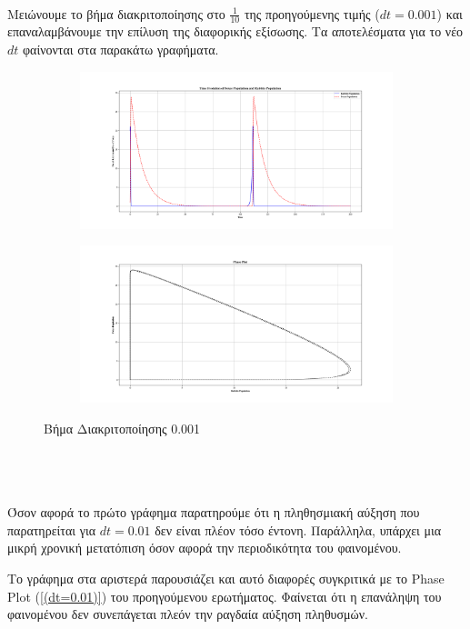 \documentclass{article}
\begin{document}
\noindent
\\
Μειώνουμε το βήμα διακριτοποίησης στο $\frac{1}{10}$ της προηγούμενης τιμής ($ dt = 0.001 $) και επαναλαμβάνουμε την επίλυση της διαφορικής εξίσωσης. Τα αποτελέσματα για το νέο $ dt $ φαίνονται στα παρακάτω γραφήματα.
\newline
\newline
\begin{figure}[H]
    \centering
	\begin{adjustbox}{center}
		\begin{subfigure}[c]{.8\textwidth}    
			\includegraphics[width=1\textwidth,height=\textheight,keepaspectratio]{media/2/dt=0.001/Figure_1.png}
		\end{subfigure}%

	    \begin{subfigure}[c]{.8\textwidth}    
			\includegraphics[width=1\textwidth,height=\textheight,keepaspectratio]{media/2/dt=0.001/Figure_2.png}
		\end{subfigure}%
	\end{adjustbox}
\caption{Βήμα Διακριτοποίησης 0.001}
\label{(dt=0.001)}
\end{figure}

\noindent
\\
\\
\\
Όσον αφορά το πρώτο γράφημα παρατηρούμε ότι η πληθησμιακή αύξηση που παρατηρείται για $ dt = 0.01 $ δεν είναι πλέον τόσο έντονη. Παράλληλα,  υπάρχει μια μικρή χρονική μετατόπιση όσον αφορά την περιοδικότητα του φαινομένου.

\noindent
\newline
Το γράφημα στα αριστερά παρουσιάζει και αυτό διαφορές συγκριτικά με το \foreignlanguage{english}{Phase Plot} (\autoref{(dt=0.01)}) του προηγούμενου ερωτήματος. Φαίνεται ότι η επανάληψη του φαινομένου δεν συνεπάγεται πλεόν την ραγδαία αύξηση πληθυσμών. 
\end{document}
